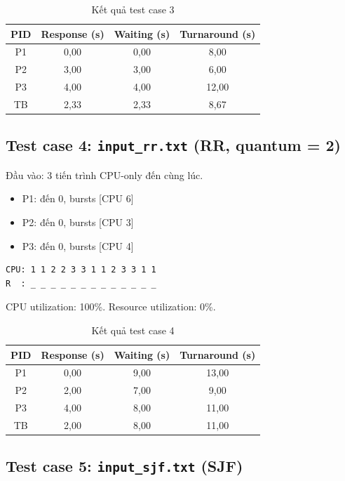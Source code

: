 \begin{table}[h]
\centering
\begin{tabular}{|c|c|c|c|}
\hline
PID & Response (s) & Waiting (s) & Turnaround (s) \\
\hline
P1 & 0,00 & 0,00 & 8,00 \\
P2 & 3,00 & 3,00 & 6,00 \\
P3 & 4,00 & 4,00 & 12,00 \\
\hline
TB & 2,33 & 2,33 & 8,67 \\
\hline
\end{tabular}
\caption{Kết quả test case 3}
\end{table}

\subsection{Test case 4: \texttt{input\_rr.txt} (RR, quantum = 2)}

Đầu vào: 3 tiến trình CPU-only đến cùng lúc.

\begin{itemize}
    \item P1: đến 0, bursts [CPU 6]
    \item P2: đến 0, bursts [CPU 3]
    \item P3: đến 0, bursts [CPU 4]
\end{itemize}

\begin{verbatim}
CPU: 1 1 2 2 3 3 1 1 2 3 3 1 1
R  : _ _ _ _ _ _ _ _ _ _ _ _ _
\end{verbatim}

CPU utilization: 100\%. Resource utilization: 0\%.

\begin{table}[h]
\centering
\begin{tabular}{|c|c|c|c|}
\hline
PID & Response (s) & Waiting (s) & Turnaround (s) \\
\hline
P1 & 0,00 & 9,00 & 13,00 \\
P2 & 2,00 & 7,00 & 9,00 \\
P3 & 4,00 & 8,00 & 11,00 \\
\hline
TB & 2,00 & 8,00 & 11,00 \\
\hline
\end{tabular}
\caption{Kết quả test case 4}
\end{table}

\subsection{Test case 5: \texttt{input\_sjf.txt} (SJF)}

